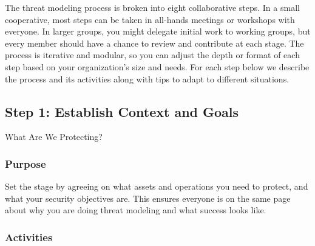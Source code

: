 The threat modeling process is broken into eight collaborative steps. In a small
cooperative, most steps can be taken in all-hands meetings or workshops with
everyone. In larger groups, you might delegate initial work to
working groups, but every member should have a chance to review and contribute
at each stage. The process is iterative and modular, so you can adjust the depth
or format of each step based on your organization's size and needs. For each
step below we describe the process and its activities
along with tips to adapt to different situations.

\subsection{Step 1: Establish Context and Goals}
\label{subsec:Step1}

What Are We Protecting?

\subsubsection{Purpose}

Set the stage by agreeing on what assets and operations you need to protect, and
what your security objectives are. This ensures everyone is on the same page
about why you are doing threat modeling and what success looks like. 

\subsubsection{Activities}

